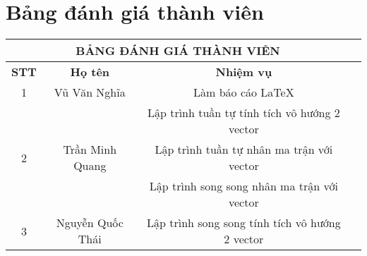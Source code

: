 \newpage
\section*{Bảng đánh giá thành viên}
 {}
\begin{center}
 \begin{tabular}{|c|c|c|c|}
 \hline
 \multicolumn{3}{|c|}{\textbf{BẢNG ĐÁNH GIÁ THÀNH VIÊN}} \\ 
 \hline
 \textbf{STT} & \textbf{Họ tên} & \textbf{Nhiệm vụ} \\ \hline
 1 & Vũ Văn Nghĩa & Làm báo cáo \LaTeX \\ 
 & & Lập trình tuần tự tính tích vô hướng 2 vector \\ \hline
 2 & Trần Minh Quang & Lập trình tuần tự nhân ma trận với vector \\ 
 & & Lập trình song song nhân ma trận với vector \\ \hline
 3 & Nguyễn Quốc Thái & Lập trình song song tính tích vô hướng 2 vector \\ \hline
 \end{tabular}
\end{center}
